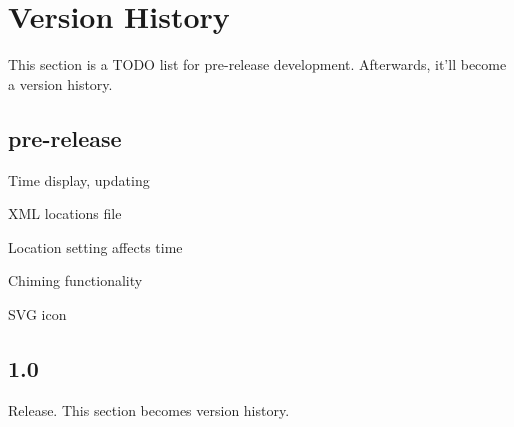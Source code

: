 \section{Version History}

This section is a TODO list for pre-release development. Afterwards, it'll become a version history.

\subsection{pre-release}

Time display, updating

XML locations file

Location setting affects time

Chiming functionality

SVG icon

\subsection{1.0}

Release. This section becomes version history.

